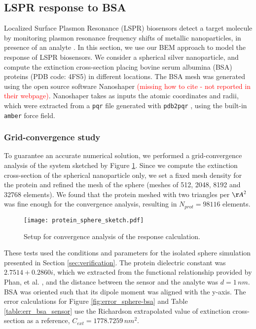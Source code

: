 \subsection{LSPR response to BSA} \label{sec:lspr_response}

Localized Surface Plasmon Resonance (LSPR) biosensors detect a target molecule by monitoring
plasmon resonance frequency shifts of metallic nanoparticles, in presence of an analyte \cite{WilletsVandyune2007}.
In this section, we use our BEM approach to model the response of LSPR biosensors.
We consider a spherical silver nanoparticle, and compute the extinction cross-section placing 
bovine serum albumina (BSA) proteins (PDB code: 4FS5) in different locations.
The BSA mesh was generated using the open source software Nanoshaper 
\textcolor{red}{(missing how to cite - not reported in their webpage)}. 
Nanoshaper takes as inputs the atomic coordinates and radii, 
which were extracted from a \texttt{pqr} file generated with 
\texttt{pdb2pqr} \cite{Dolinsky04}, using the built-in \texttt{amber} force field.

\subsubsection{Grid-convergence study} \label{sec:bsa_convergence}
To guarantee an accurate numerical solution, we performed a grid-convergence 
analysis of the system sketched by Figure \ref{fig:setup_conv}. 
Since we compute the extinction cross-section of the spherical nanoparticle only, we 
set a fixed mesh density for the protein and refined the mesh of the
sphere (meshes of 512, 2048, 8192 and 32768 elements). We found that the protein meshed with two
triangles per ${\AA}^2$ was fine enough for the convergence analysis, resulting in $N_{prot} = 98116$ elements. 


\begin{figure}[h] %
   \centering
   \texttt{[image: protein\_sphere\_sketch.pdf]} 
   \caption{Setup for convergence analysis of the response calculation.}
   \label{fig:setup_conv}
\end{figure}

These tests used the conditions and parameters for the isolated sphere simulation
presented in Section \ref{sec:verification}. The protein dielectric constant was
$2.7514 + 0.2860i$, which we extracted from the 
functional relationship provided by Phan, et al. \cite{PahnETal2013}, and the 
distance between the sensor and the analyte was $d=1 \, nm$. BSA was oriented such that
its dipole moment was aligned with the y-axis. The error calculations for Figure \ref{fig:error_sphere-bsa}
and Table \ref{table:err_bsa_sensor} use the Richardson extrapolated value of extinction cross-section as a
reference, $C_{ext}= 1778.7259 \, nm^2$.


